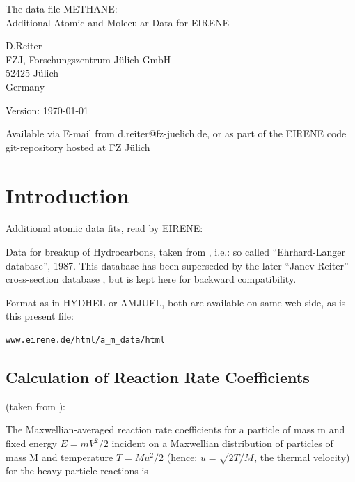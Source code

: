 \documentclass[12pt,dvipdfmx]{article}
\begin{document}
\parindent 0pt
{\LARGE \bf \center
\vspace*{3truecm}

The data file METHANE: \\
Additional Atomic and Molecular Data for EIRENE
\vspace*{3truecm}

D.Reiter \\
FZJ, Forschungszentrum J\"ulich GmbH \\
52425 J\"ulich \\
Germany
\vspace{3truecm}

Version: \today
\vspace{1truecm}

Available via E-mail from d.reiter@fz-juelich.de, or as part of the
EIRENE code git-repository hosted at FZ J\"ulich
}
\newpage
\renewcommand\thesection{\Roman{section}}
\tableofcontents
\newpage
\section{Introduction}\label{sec-intro}

Additional atomic data fits, read by EIRENE:

Data for breakup of Hydrocarbons, taken from \cite{kn:Ehrhardt}, i.e.: so called ``Ehrhard-Langer database'', 1987.
This database has been superseded by the later ``Janev-Reiter'' cross-section database \cite{kn:JR-2002}, but is kept here
for backward compatibility.

Format as in HYDHEL \cite{kn:Janev} or AMJUEL,
both are available on same web side, as is this present file:
\begin{verbatim}
www.eirene.de/html/a_m_data/html
\end{verbatim}
\subsection{Calculation of Reaction Rate Coefficients}
(taken from \cite{kn:Janev}):

The Maxwellian-averaged reaction rate coefficients for a particle of mass m and fixed energy
$E = mV^2/2$
incident on a Maxwellian distribution of particles of mass M
and temperature $T = Mu^2/2$ (hence: $u = \sqrt{2T/M}$, the thermal velocity) for the
heavy-particle reactions is\\
\end{document}
